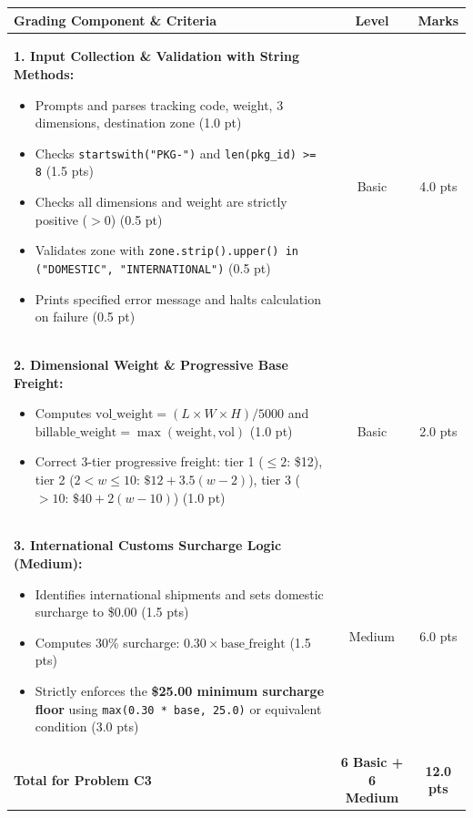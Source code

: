 \documentclass[11pt,a4paper]{article}
\begin{document}
\begin{center}
\renewcommand{\arraystretch}{1.18}
\setlength{\tabcolsep}{3.5pt}
\begin{tabularx}{\textwidth}{|X|c|c|}
\hline
\textbf{Grading Component \& Criteria} & \textbf{Level} & \textbf{Marks} \\
\hline
\textbf{1. Input Collection \& Validation with String Methods:}
\begin{itemize}[itemsep=0.1pt,topsep=0.1pt]
  \item Prompts and parses tracking code, weight, 3 dimensions, destination zone (1.0 pt)
  \item Checks \texttt{startswith("PKG-")} and \texttt{len(pkg\_id) >= 8} (1.5 pts)
  \item Checks all dimensions and weight are strictly positive ($> 0$) (0.5 pt)
  \item Validates zone with \texttt{zone.strip().upper() in ("DOMESTIC", "INTERNATIONAL")} (0.5 pt)
  \item Prints specified error message and halts calculation on failure (0.5 pt)
\end{itemize} & Basic & 4.0 pts \\
\hline
\textbf{2. Dimensional Weight \& Progressive Base Freight:}
\begin{itemize}[itemsep=0.1pt,topsep=0.1pt]
  \item Computes $\text{vol\_weight} = (L \times W \times H) / 5000$ and $\text{billable\_weight} = \max(\text{weight}, \text{vol})$ (1.0 pt)
  \item Correct 3-tier progressive freight: tier 1 ($\le 2$: \$12), tier 2 ($2 < w \le 10$: $\$12 + 3.5(w-2)$), tier 3 ($> 10$: $\$40 + 2(w-10)$) (1.0 pt)
\end{itemize} & Basic & 2.0 pts \\
\hline
\textbf{3. International Customs Surcharge Logic (Medium):}
\begin{itemize}[itemsep=0.1pt,topsep=0.1pt]
  \item Identifies international shipments and sets domestic surcharge to \$0.00 (1.5 pts)
  \item Computes 30\% surcharge: $0.30 \times \text{base\_freight}$ (1.5 pts)
  \item Strictly enforces the \textbf{\$25.00 minimum surcharge floor} using \texttt{max(0.30 * base, 25.0)} or equivalent condition (3.0 pts)
\end{itemize} & Medium & 6.0 pts \\
\hline
\textbf{Total for Problem C3} & \textbf{6 Basic + 6 Medium} & \textbf{12.0 pts} \\
\hline
\end{tabularx}
\end{center}
\end{document}
